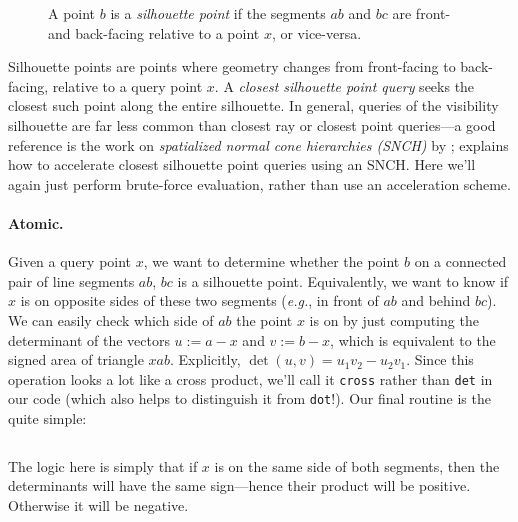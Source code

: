 \documentclass{article}
\newcommand{\code}[1]{\texttt{\small{#1}}}
\newcommand{\eg}{\emph{e.g.}} %
\renewcommand{\vec}[1]{#1}
\begin{document}
\begin{figure}[h!]
   \centering
   
   
   
   \caption{A point \(\vec{b}\) is a \emph{silhouette point} if the segments \(\vec{a}\vec{b}\) and \(\vec{b}\vec{c}\) are front- and back-facing relative to a point \(\vec{x}\), or vice-versa.}
\end{figure}

Silhouette points are points where geometry changes from front-facing to back-facing, relative to a query point \(\vec{x}\).  A \emph{closest silhouette point query} seeks the closest such point along the entire silhouette.  In general, queries of the visibility silhouette are far less common than closest ray or closest point queries---a good reference is the work on \emph{spatialized normal cone hierarchies (SNCH)} by \citet{johnson2001spatialized}; \citet[Section 5.1]{Sawhney:2023:WoSt} explains how to accelerate closest silhouette point queries using an SNCH.  Here we'll again just perform brute-force evaluation, rather than use an acceleration scheme.

\paragraph{Atomic.} Given a query point \(\vec{x}\), we want to determine whether the point \(\vec{b}\) on a connected pair of line segments \(\vec{a}\vec{b}\), \(\vec{b}\vec{c}\) is a silhouette point.  Equivalently, we want to know if \(\vec{x}\) is on opposite sides of these two segments (\eg{}, in front of \(\vec{a}\vec{b}\) and behind \(\vec{b}\vec{c}\)).  We can easily check which side of \(\vec{a}\vec{b}\) the point \(\vec{x}\) is on by just computing the determinant of the vectors \(\vec{u} := \vec{a}-\vec{x}\) and \(\vec{v} := \vec{b}-\vec{x}\), which is equivalent to the signed area of triangle \(xab\).  Explicitly, \(\det(\vec{u},\vec{v}) = \vec{u}_1 \vec{v}_2 - \vec{u}_2 \vec{v}_1\).  Since this operation looks a lot like a cross product, we'll call it \code{cross} rather than \code{det} in our code (which also helps to distinguish it from \code{dot}!).  Our final routine is the quite simple:

\inputminted[fontsize=\small,linenos,firstline=43,lastline=46,bgcolor=bg]{cpp}{../code/WoStLaplace2D.cpp}

The logic here is simply that if \(\vec{x}\) is on the same side of both segments, then the determinants will have the same sign---hence their product will be positive.  Otherwise it will be negative.
\end{document}
